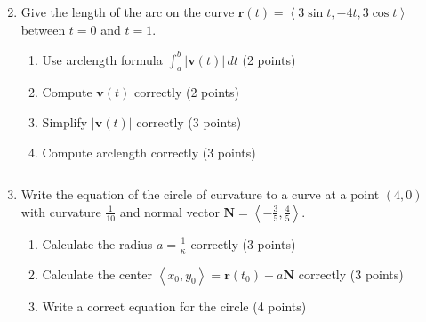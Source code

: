 \documentclass[12pt]{article}
\newcommand{\up}{$~$\vspace*{-0.7in}}
\newcommand{\liner}{\noindent\underline{\hspace*{7in}}}
\newcommand{\ds}{\displaystyle}
\renewcommand{\vec}{\mathbf}
\newcommand{\<}{\left<}
\renewcommand{\>}{\right>}
\newcommand{\dvar}{\,d}
\begin{document}
\begin{enumerate}
\vspace*{6.5in}

\liner

\newpage\up


\item Give the length of the arc on the curve $\vec{r}(t) = \left< 3\sin t, -4t, 3\cos t \right>$ between $t=0$ and $t=1$.

  \begin{enumerate}
    \item Use arclength formula $\ds \int_a^b |\vec{v}(t)| \dvar{t}$ (2 points)
    \item Compute $\vec{v}(t)$ correctly (2 points)
    \item Simplify $|\vec{v}(t)|$ correctly (3 points)
    \item Compute arclength correctly (3 points)
  \end{enumerate}

\vspace*{8in}

\liner
\newpage\up


\item Write the equation of the circle of curvature to a curve at a point $(4,0)$ with curvature $\frac{1}{10}$ and normal vector $\vec{N} = \left<-\frac{3}{5},\frac{4}{5}\right>$.

  \begin{enumerate}
    \item Calculate the radius $a = \frac{1}{\kappa}$ correctly (3 points)
    \item Calculate the center $\<x_0,y_0\> = \vec{r}(t_0) + a\vec{N}$ correctly (3 points)
    \item Write a correct equation for the circle (4 points)
  \end{enumerate}

\vspace*{7.5in}

\liner
\newpage\up




\end{enumerate}
\end{document}
